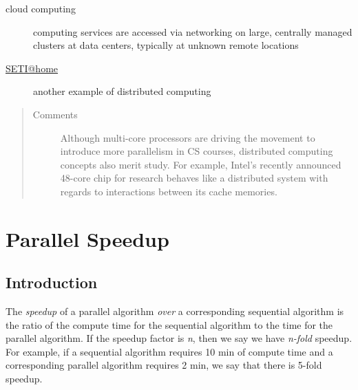 \documentclass[letterpaper,10pt,openany,oneside]{sphinxmanual}
\begin{document}
\begin{description}
\item[{cloud computing}] \leavevmode{}\label{Introduction/Introduction:term-cloud-computing}
computing services are accessed via networking on large, centrally managed clusters at data centers, typically at unknown remote locations

\end{description}
\begin{description}
\item[{\href{mailto:SETI@home}{SETI@home}}] \leavevmode{}\label{Introduction/Introduction:term-seti-home}
another example of distributed computing

\end{description}
\begin{quote}\begin{description}
\item[{Comments}] \leavevmode
Although multi-core processors are driving the movement to introduce more parallelism in CS courses, distributed computing concepts also merit study. For example, Intel's recently announced 48-core chip for research behaves like a distributed system with regards to interactions between its cache memories.

\end{description}\end{quote}


\chapter{Parallel Speedup}
\label{ParallelSpeedup/ParallelSpeedup:parallel-speedup}\label{ParallelSpeedup/ParallelSpeedup::doc}

\section{Introduction}
\label{ParallelSpeedup/ParallelSpeedup:introduction}
The \emph{speedup} of a parallel algorithm \emph{over} a corresponding sequential algorithm is the ratio of the compute time for the sequential algorithm to the time for the parallel algorithm.  If the speedup factor is \emph{n}, then we say we have \emph{n-fold} speedup.  For example, if a sequential algorithm requires 10 min of compute time and a corresponding parallel algorithm requires 2 min, we say that there is 5-fold speedup.
\end{document}
